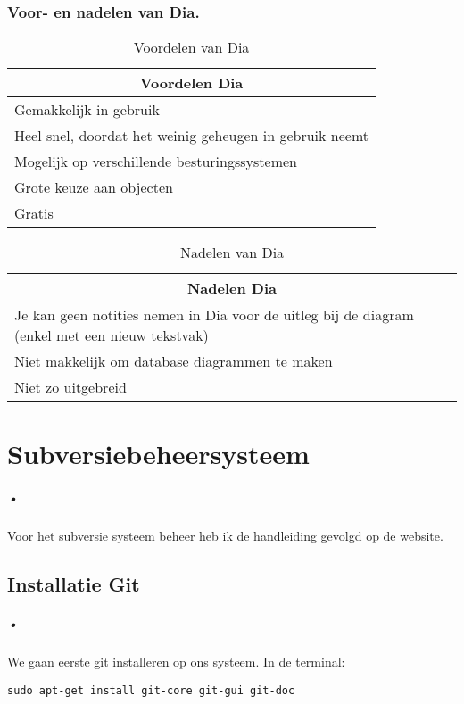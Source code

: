 \documentclass[11pt]{report}
\begin{document}
\subsection{Voor- en nadelen van Dia.}
\begin{table}[h]
\caption{Voordelen van Dia}
\centering
\begin{tabular}{|p{10cm}|} \hline
\multicolumn{1}{|c|}{Voordelen Dia} \\ \hline \hline
Gemakkelijk in gebruik \\  \hline
Heel snel, doordat het weinig geheugen in gebruik neemt\\  \hline
Mogelijk op verschillende besturingssystemen\\  \hline
Grote keuze aan objecten \\  \hline
Gratis \\  \hline
\end{tabular}
\end{table}
\begin{table}[h]
\caption{Nadelen van Dia}
\centering
\begin{tabular}{|p{10cm}|} \hline
\multicolumn{1}{|c|}{Nadelen Dia} \\ \hline \hline
Je kan geen notities nemen in Dia voor de uitleg bij de diagram (enkel met een nieuw tekstvak) \\  \hline
Niet makkelijk om database diagrammen te maken \\  \hline
Niet zo uitgebreid \\  \hline
\end{tabular}
\end{table}
\newpage
\appendix
\renewcommand*{\appendixname}{Bijlage}
\chapter{Subversiebeheersysteem}
\paragraph{•}
Voor het subversie systeem beheer heb ik de handleiding gevolgd op de website.
\section{Installatie Git}
\paragraph{•}
We gaan eerste git installeren op ons systeem.
In de terminal:
\begin{lstlisting}
sudo apt-get install git-core git-gui git-doc
\end{lstlisting}
\end{document}
